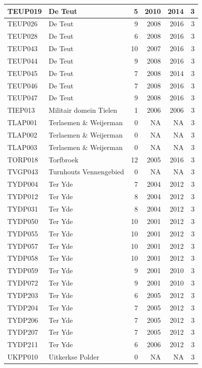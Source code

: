 \documentclass[11pt,]{book}
\begin{document}
\begin{table}
\begin{tabular}[t]{l|l|r|r|r|r}
\hline
TEUP019 & De Teut & 5 & 2010 & 2014 & 3\\
\hline
TEUP026 & De Teut & 9 & 2008 & 2016 & 3\\
\hline
TEUP028 & De Teut & 6 & 2008 & 2016 & 3\\
\hline
TEUP043 & De Teut & 10 & 2007 & 2016 & 3\\
\hline
TEUP044 & De Teut & 9 & 2008 & 2016 & 3\\
\hline
TEUP045 & De Teut & 7 & 2008 & 2014 & 3\\
\hline
TEUP046 & De Teut & 7 & 2008 & 2016 & 3\\
\hline
TEUP047 & De Teut & 9 & 2008 & 2016 & 3\\
\hline
TIEP013 & Militair domein Tielen & 1 & 2006 & 2006 & 3\\
\hline
TLAP001 & Terlaemen \& Weijerman & 0 & NA & NA & 3\\
\hline
TLAP002 & Terlaemen \& Weijerman & 0 & NA & NA & 3\\
\hline
TLAP003 & Terlaemen \& Weijerman & 0 & NA & NA & 3\\
\hline
TORP018 & Torfbroek & 12 & 2005 & 2016 & 3\\
\hline
TVGP043 & Turnhouts Vennengebied & 0 & NA & NA & 3\\
\hline
TYDP004 & Ter Yde & 7 & 2004 & 2012 & 3\\
\hline
TYDP012 & Ter Yde & 8 & 2004 & 2012 & 3\\
\hline
TYDP031 & Ter Yde & 8 & 2004 & 2012 & 3\\
\hline
TYDP050 & Ter Yde & 10 & 2001 & 2012 & 3\\
\hline
TYDP055 & Ter Yde & 10 & 2001 & 2012 & 3\\
\hline
TYDP057 & Ter Yde & 10 & 2001 & 2012 & 3\\
\hline
TYDP058 & Ter Yde & 10 & 2001 & 2012 & 3\\
\hline
TYDP059 & Ter Yde & 9 & 2001 & 2010 & 3\\
\hline
TYDP072 & Ter Yde & 9 & 2001 & 2010 & 3\\
\hline
TYDP203 & Ter Yde & 6 & 2005 & 2012 & 3\\
\hline
TYDP204 & Ter Yde & 7 & 2005 & 2012 & 3\\
\hline
TYDP206 & Ter Yde & 7 & 2005 & 2012 & 3\\
\hline
TYDP207 & Ter Yde & 7 & 2005 & 2012 & 3\\
\hline
TYDP211 & Ter Yde & 6 & 2006 & 2012 & 3\\
\hline
UKPP010 & Uitkerkse Polder & 0 & NA & NA & 3\\

\end{tabular}
\end{table}
\end{document}

